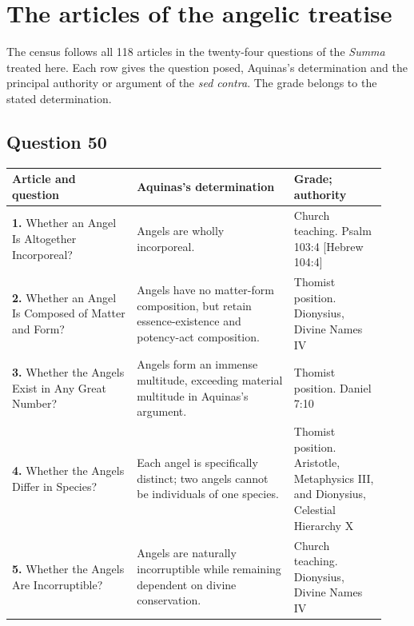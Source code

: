 \section{The articles of the angelic treatise}
\label{app:census}

The census follows all 118 articles in the twenty-four questions of the
\emph{Summa} treated here. Each row gives the question posed, Aquinas's
determination and the principal authority or argument of the
\emph{sed contra}. The grade belongs to the stated determination.

\subsection{Question 50}
\begin{longtable}{@{}>{\raggedright\arraybackslash}p{0.31\linewidth}>{\raggedright\arraybackslash}p{0.39\linewidth}>{\raggedright\arraybackslash}p{0.23\linewidth}@{}}
\toprule
Article and question & Aquinas's determination & Grade; authority\\
\midrule\endhead
\textbf{1.} Whether an Angel Is Altogether Incorporeal? & Angels are wholly incorporeal. & Church teaching. Psalm 103:4 [Hebrew 104:4]\\
\textbf{2.} Whether an Angel Is Composed of Matter and Form? & Angels have no matter-form composition, but retain essence-existence and potency-act composition. & Thomist position. Dionysius, Divine Names IV\\
\textbf{3.} Whether the Angels Exist in Any Great Number? & Angels form an immense multitude, exceeding material multitude in Aquinas's argument. & Thomist position. Daniel 7:10\\
\textbf{4.} Whether the Angels Differ in Species? & Each angel is specifically distinct; two angels cannot be individuals of one species. & Thomist position. Aristotle, Metaphysics III, and Dionysius, Celestial Hierarchy X\\
\textbf{5.} Whether the Angels Are Incorruptible? & Angels are naturally incorruptible while remaining dependent on divine conservation. & Church teaching. Dionysius, Divine Names IV\\
\bottomrule
\end{longtable}
